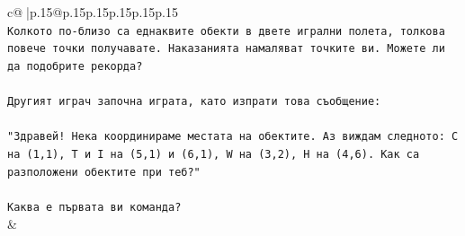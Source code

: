 \documentclass{article}
\begin{document}
{\begin{supertabular}{c@{$\;$}|p{.15\linewidth}@{}p{.15\linewidth}p{.15\linewidth}p{.15\linewidth}p{.15\linewidth}p{.15\linewidth}}
{{{\\ 
\texttt{Колкото по{-}близо са еднаквите обекти в двете игрални полета, толкова повече точки получавате. Наказанията намаляват точките ви. Можете ли да подобрите рекорда?} \\
\\ 
\texttt{Другият играч започна играта, като изпрати това съобщение:} \\
\\ 
\texttt{"Здравей! Нека координираме местата на обектите. Аз виждам следното: C на (1,1), T и I на (5,1) и (6,1), W на (3,2), H на (4,6). Как са разположени обектите при теб?"} \\
\\ 
\texttt{Каква е първата ви команда?} \\
            }
        }
    }
    & \\ \\


\end{supertabular}}
\end{document}
